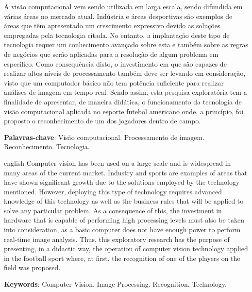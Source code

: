 \begin{resumo}[RESUMO]
A visão computacional vem sendo utilizada em larga escala, sendo difundida em várias áreas no mercado atual. Indústria e áreas desportivas são exemplos de áreas que têm apresentado um crescimento expressivo devido as soluções empregadas pela tecnologia citada. No entanto, a implantação deste tipo de tecnologia requer um conhecimento avançado sobre esta e também sobre as regras de negócios que serão aplicadas para a resolução de algum problema em específico. Como consequência disto, o investimento em  que são capazes de realizar altos níveis de processamento também deve ser levando em consideração, visto que um computador básico não tem potência suficiente para realizar análises de imagem em tempo real. Sendo assim, esta pesquisa exploratória tem a finalidade de apresentar, de maneira didática, o funcionamento da tecnologia de visão computacional aplicada no esporte futebol americano onde, a princípio, foi proposto o reconhecimento de um dos jogadores dentro de campo.

 \textbf{Palavras-chave}: Visão computacional. Processamento de imagem. Reconhecimento. Tecnologia.
\end{resumo}

\begin{resumo}[ABSTRACT]
 \begin{otherlanguage*}{english}
Computer vision has been used on a large scale and is widespread in many areas of the current market. Industry and sports are examples of areas that have shown significant growth due to the solutions employed by the technology mentioned. However, deploying this type of technology requires advanced knowledge of this technology as well as the business rules that will be applied to solve any particular problem. As a consequence of this, the investment in hardware that is capable of performing high processing levels must also be taken into consideration, as a basic computer does not have enough power to perform real-time image analysis. Thus, this exploratory research has the purpose of presenting, in a didactic way, the operation of computer vision technology applied in the football sport where, at first, the recognition of one of the players on the field was proposed.

   \noindent 
   \textbf{Keywords}: Computer Vision. Image Processing. Recognition. Technology.
 \end{otherlanguage*}
\end{resumo}